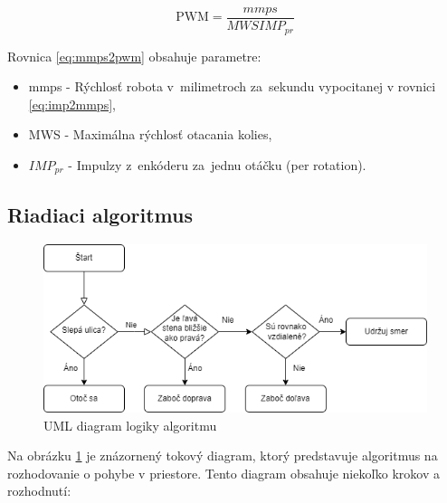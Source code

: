 \begin{equation}
	\text{PWM} = \frac{mmps}{MWS IMP_{pr}}
	\label{eq:mmps2pwm}
\end{equation}

Rovnica \ref{eq:mmps2pwm} obsahuje parametre:
\begin{itemize}
	\item mmps - Rýchlosť robota v~milimetroch za~sekundu vypocitanej v rovnici \ref{eq:imp2mmps},
	\item MWS - Maximálna rýchlosť otacania kolies,
	\item $IMP_{pr}$ - Impulzy z~enkóderu za~jednu otáčku (per rotation).
\end{itemize}

\subsection{Riadiaci algoritmus}
\begin{figure}[!htpb]
	\centering
	\includegraphics[width=1\linewidth]{includes//images/uml_algo.png}
	\caption{UML diagram logiky algoritmu }
	\label{fig:uml_algo}
\end{figure}
Na obrázku \ref{fig:uml_algo} je znázornený tokový diagram, ktorý predstavuje algoritmus na rozhodovanie o pohybe v priestore. Tento diagram obsahuje niekoľko krokov a rozhodnutí:
